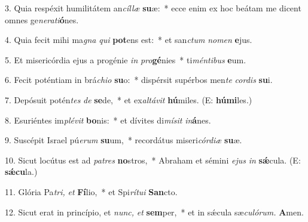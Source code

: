 \item 3. Quia respéxit humilitátem an\textit{cíllæ} \textbf{su}æ:~* ecce enim ex hoc beátam me dicent omnes ge\textit{nerati}\textbf{ó}nes.

\item 4. Quia fecit mihi ma\textit{gna} \textit{qui} \textbf{pot}ens est:~* et san\textit{ctum} \textit{nomen} \textbf{e}jus.

\item 5. Et misericórdia ejus a progénie \textit{in} \textit{pro}\textbf{gé}nies~* ti\textit{méntibus} \textbf{e}um.

\item 6. Fecit poténtiam in brá\textit{chio} \textbf{su}o:~* dispérsit supérbos men\textit{te} \textit{cordis} \textbf{su}i.

\item 7. Depósuit potén\textit{tes} \textit{de} \textbf{se}de,~* et ex\hspace{0.03em}\textit{altávit} \textbf{hú}miles. (E: \textbf{hú}\textbf{mi}les.)

\item 8. Esuriéntes im\textit{plévit} \textbf{bo}nis:~* et dívites di\textit{mísit} \textit{in}\textbf{á}nes.

\item 9. Suscépit Israel pú\textit{erum} \textbf{su}um,~* recordátus miseri\hspace{0.01em}\textit{córdiæ} \textbf{su}æ.

\item 10. Sicut locútus est ad \textit{patres} \textbf{no}stros,~* Abraham et sémini \textit{ejus} \textit{in}  \textbf{sǽ}cula. (E: \textbf{sǽcu}la.)

\item 11. Glória Pa\textit{tri,} \textit{et} \textbf{Fí}lio,~* et Spi\textit{rítui} \textbf{San}cto.

\item 12. Sicut erat in princípio, et \textit{nunc,} \textit{et} \textbf{sem}per,~* et in sǽcula sæ\hspace{0.01em}\textit{culórum.} \textbf{A}men.
